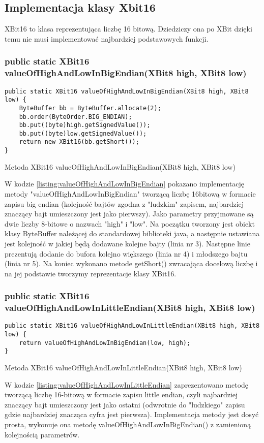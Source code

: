 	\subsection{Implementacja klasy Xbit16}
	XBit16 to klasa reprezentująca liczbę 16 bitową. Dziedziczy ona po XBit dzięki temu nie musi implementować najbardziej podstawowych funkcji. 
	
	
	\subsubsection{public static XBit16 valueOfHighAndLowInBigEndian(XBit8 high, XBit8 low)}
	\begin{listing}[h]
		\begin{verbatim}
public static XBit16 valueOfHighAndLowInBigEndian(XBit8 high, XBit8 low) {
	ByteBuffer bb = ByteBuffer.allocate(2);
	bb.order(ByteOrder.BIG_ENDIAN);
	bb.put((byte)high.getSignedValue());
	bb.put((byte)low.getSignedValue());
	return new XBit16(bb.getShort());
}
		\end{verbatim}
		\caption{Metoda XBit16 valueOfHighAndLowInBigEndian(XBit8 high, XBit8 low)}
		\label{listing:valueOfHighAndLowInBigEndian}
	\end{listing}
	W kodzie \ref{listing:valueOfHighAndLowInBigEndian} pokazano implementację metody "valueOfHighAndLowInBigEndian" tworzącą liczbę 16bitową w formacie zapisu big endian (kolejność bajtów zgodna z "ludzkim" zapisem, najbardziej znaczący bajt umieszczony jest jako pierwszy).  Jako parametry przyjmowane są dwie liczby 8-bitowe o nazwach "high" i "low". 
	Na początku tworzony jest obiekt klasy ByteBuffer należącej do standardowej biblioteki java, a następnie ustawiana jest kolejność w jakiej będą dodawane kolejne bajty (linia nr 3). Następne linie prezentują dodanie do bufora kolejno większego (linia nr 4) i młodszego  bajtu (linia nr 5). Na koniec wykonano metode getShort() zwracająca docelową liczbę i na jej podstawie tworzymy reprezentacje klasy XBit16.
	
	\subsubsection{public static XBit16 valueOfHighAndLowInLittleEndian(XBit8 high, XBit8 low)}
		\begin{listing}[h]
		\begin{verbatim}
public static XBit16 valueOfHighAndLowInLittleEndian(XBit8 high, XBit8 low) {
	return valueOfHighAndLowInBigEndian(low, high);
}
		\end{verbatim}
		\caption{Metoda XBit16 valueOfHighAndLowInLittleEndian(XBit8 high, XBit8 low)}
		\label{listing:valueOfHighAndLowInLittleEndian}
	\end{listing}
	W kodzie \ref{listing:valueOfHighAndLowInLittleEndian} zaprezentowano metodę tworzącą liczbę 16-bitową w formacie zapisu little endian, czyli najbardziej znaczący bajt umieszczony jest jako ostatni (odwrotnie do "ludzkiego" zapisu gdzie najbardziej znacząca cyfra jest pierwsza).
	Implementacja metody jest dosyć prosta, wykonuje ona metodę valueOfHighAndLowInBigEndian() z zamienioną kolejnością parametrów.


